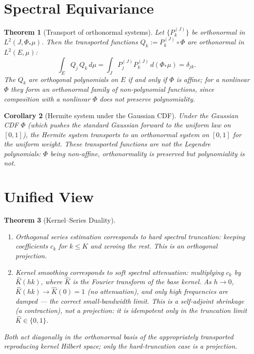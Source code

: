 \documentclass[11pt,twoside,openright]{book}
\theoremstyle{plain}
\newtheorem{theorem}{Theorem}[chapter]
\newtheorem{corollary}[theorem]{Corollary}
\theoremstyle{definition}
\theoremstyle{remark}
\begin{document}
\section{Spectral Equivariance}

\begin{theorem}[Transport of orthonormal systems]
\label{thm:spectral-equivariance}
Let $\{P_k^{(J)}\}$ be orthonormal in $L^2(J,\Phi_*\mu)$. Then the transported functions $Q_k := P_k^{(J)}\circ\Phi$ are orthonormal in $L^2(E,\mu)$:
\begin{equation}
\int_E Q_j\,Q_k\,d\mu = \int_J P_j^{(J)}P_k^{(J)}\,d(\Phi_*\mu) = \delta_{jk}.
\label{eq:spectral-equivariance}
\end{equation}
The $Q_k$ are orthogonal \emph{polynomials} on $E$ if and only if $\Phi$ is affine; for a nonlinear $\Phi$ they form an orthonormal family of \emph{non-polynomial} functions, since composition with a nonlinear $\Phi$ does not preserve polynomiality.
\end{theorem}

\begin{corollary}[Hermite system under the Gaussian CDF]
Under the Gaussian CDF $\Phi$ (which pushes the standard Gaussian forward to the uniform law on $[0,1]$), the Hermite system transports to an orthonormal system on $[0,1]$ for the uniform weight. These transported functions are \emph{not} the Legendre polynomials: $\Phi$ being non-affine, orthonormality is preserved but polynomiality is not.
\end{corollary}

\section{Unified View}

\begin{theorem}[Kernel--Series Duality]
\label{thm:kernel-series}
\begin{enumerate}
\item Orthogonal series estimation corresponds to \emph{hard spectral truncation}: keeping coefficients $c_k$ for $k \leq K$ and zeroing the rest. This \emph{is} an orthogonal projection.
\item Kernel smoothing corresponds to \emph{soft spectral attenuation}: multiplying $c_k$ by $\hat{K}(hk)$, where $\hat{K}$ is the Fourier transform of the base kernel. As $h\to0$, $\hat{K}(hk)\to\hat{K}(0)=1$ (no attenuation), and only high frequencies are damped --- the correct small-bandwidth limit. This is a self-adjoint \emph{shrinkage} (a contraction), \emph{not} a projection: it is idempotent only in the truncation limit $\hat{K}\in\{0,1\}$.
\end{enumerate}
Both act diagonally in the orthonormal basis of the appropriately transported reproducing kernel Hilbert space; only the hard-truncation case is a projection.
\end{theorem}
\end{document}
